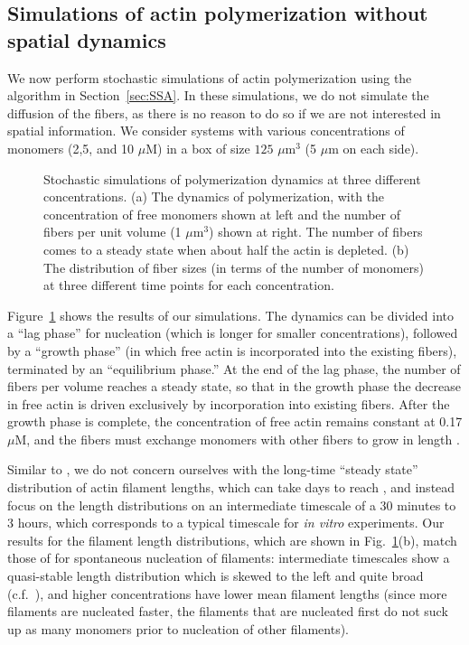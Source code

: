 \documentclass[11pt]{article}
\begin{document}
\subsection{Simulations of actin polymerization without spatial dynamics}
We now perform stochastic simulations of actin polymerization using the algorithm in Section\ \ref{sec:SSA}. In these simulations, we do not simulate the diffusion of the fibers, as there is no reason to do so if we are not interested in spatial information. We consider systems with various concentrations of monomers (2,5, and 10 $\mu$M) in a box of size $125$ $\mu$m$^3$ (5 $\mu$m on each side). 

\begin{figure}
\centering
{}
\caption{\label{fig:ActinPolyMix}Stochastic simulations of polymerization dynamics at three different concentrations. (a) The dynamics of polymerization, with the concentration of free monomers shown at left and the number of fibers per unit volume (1 $\mu$m$^3$) shown at right. The number of fibers comes to a steady state when about half the actin is depleted. (b) The distribution of fiber sizes (in terms of the number of monomers) at three different time points for each concentration.}
\end{figure}

Figure\ \ref{fig:ActinPolyMix} shows the results of our simulations. The dynamics can be divided into a ``lag phase'' for nucleation (which is longer for smaller concentrations), followed by a ``growth phase'' (in which free actin is incorporated into the existing fibers), terminated by an ``equilibrium phase.'' At the end of the lag phase, the number of fibers per volume reaches a steady state, so that in the growth phase the decrease in free actin is driven exclusively by incorporation into existing fibers. After the growth phase is complete, the concentration of free actin remains constant at 0.17 $\mu$M, and the fibers must exchange monomers with other fibers to grow in length \cite{hu2007theoretical}.

Similar to \cite{banerjee2022emergence}, we do not concern ourselves with the long-time ``steady state'' distribution of actin filament lengths, which can take days to reach \cite{hu2007theoretical, fass2008stochastic, mohapatra2017limiting}, and instead focus on the length distributions on an intermediate timescale of a 30 minutes to 3 hours, which corresponds to a typical timescale for \emph{in vitro} experiments. Our results for the filament length distributions, which are shown in Fig.\ \ref{fig:ActinPolyMix}(b), match those of \cite{banerjee2022emergence} for spontaneous nucleation of filaments: intermediate timescales show a quasi-stable length distribution which is skewed to the left and quite broad (c.f.\ \cite[Fig.~2c]{banerjee2022emergence}), and higher concentrations have lower mean filament lengths (since more filaments are nucleated faster, the filaments that are nucleated first do not suck up as many monomers prior to nucleation of other filaments). 
\end{document}
